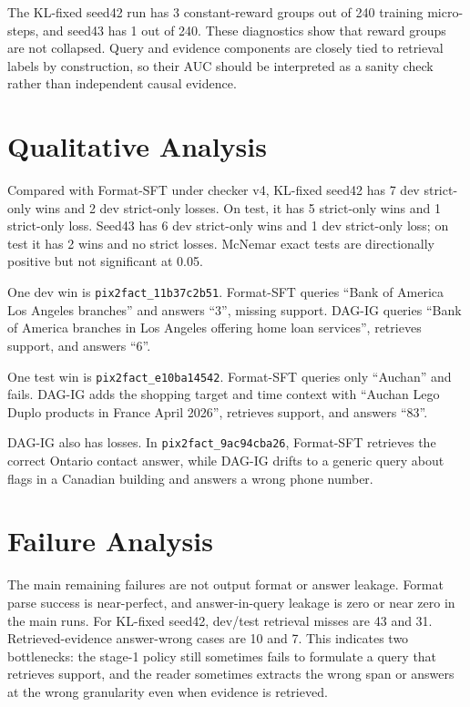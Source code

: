 The KL-fixed seed42 run has 3 constant-reward groups out of 240 training micro-steps, and seed43 has 1 out of 240. These diagnostics show that reward groups are not collapsed. Query and evidence components are closely tied to retrieval labels by construction, so their AUC should be interpreted as a sanity check rather than independent causal evidence.

\section{Qualitative Analysis}

Compared with Format-SFT under checker v4, KL-fixed seed42 has 7 dev strict-only wins and 2 dev strict-only losses. On test, it has 5 strict-only wins and 1 strict-only loss. Seed43 has 6 dev strict-only wins and 1 dev strict-only loss; on test it has 2 wins and no strict losses. McNemar exact tests are directionally positive but not significant at 0.05.

One dev win is \texttt{pix2fact\_11b37c2b51}. Format-SFT queries ``Bank of America Los Angeles branches'' and answers ``3'', missing support. DAG-IG queries ``Bank of America branches in Los Angeles offering home loan services'', retrieves support, and answers ``6''.

One test win is \texttt{pix2fact\_e10ba14542}. Format-SFT queries only ``Auchan'' and fails. DAG-IG adds the shopping target and time context with ``Auchan Lego Duplo products in France April 2026'', retrieves support, and answers ``83''.

DAG-IG also has losses. In \texttt{pix2fact\_9ac94cba26}, Format-SFT retrieves the correct Ontario contact answer, while DAG-IG drifts to a generic query about flags in a Canadian building and answers a wrong phone number.

\section{Failure Analysis}

The main remaining failures are not output format or answer leakage. Format parse success is near-perfect, and answer-in-query leakage is zero or near zero in the main runs. For KL-fixed seed42, dev/test retrieval misses are 43 and 31. Retrieved-evidence answer-wrong cases are 10 and 7. This indicates two bottlenecks: the stage-1 policy still sometimes fails to formulate a query that retrieves support, and the reader sometimes extracts the wrong span or answers at the wrong granularity even when evidence is retrieved.

